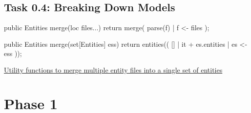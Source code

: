 \documentclass[a4paper]{article}
\def\source#1#2{\href{http://svn.rascal-mpl.org/lwc/trunk/lwc11/src/#1}{#2}}
\begin{document}
\subsection*{Task 0.4: Breaking Down Models}

\begin{listing}
\begin{rascal}
public Entities merge(loc files...) {
    return merge({ parse(f) | f <- files });
}

public Entities merge(set[Entities] ess) {
    return entities(( [] | it + es.entities | es <- ess ));
}
\end{rascal}
\caption{\source{lang/entities/utils/Merge.rsc}{Utility functions to
    merge multiple entity files into a single set of entities}}
\end{listing}



\section{Phase 1}
\end{document}
